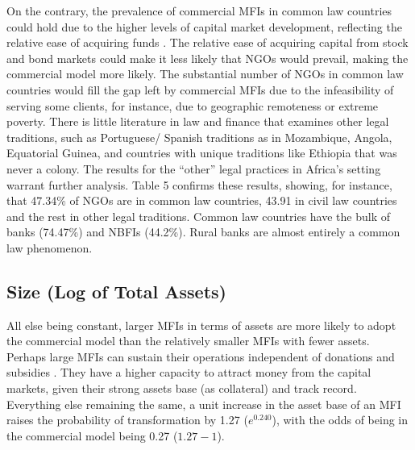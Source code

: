 \documentclass[a4paper,nobind]{templates/ociamthesis}
\begin{document}
On the contrary, the prevalence of commercial MFIs in common law countries could hold due to the higher levels of capital market development, reflecting the relative ease of acquiring funds \autocite{schnyder2018twenty}. The relative ease of acquiring capital from stock and bond markets could make it less likely that NGOs would prevail, making the commercial model more likely. The substantial number of NGOs in common law countries would fill the gap left by commercial MFIs due to the infeasibility of serving some clients, for instance, due to geographic remoteness or extreme poverty. There is little literature in law and finance that examines other legal traditions, such as Portuguese/ Spanish traditions as in Mozambique, Angola, Equatorial Guinea, and countries with unique traditions like Ethiopia that was never a colony. The results for the ``other'' legal practices in Africa's setting warrant further analysis. Table 5 confirms these results, showing, for instance, that 47.34\% of NGOs are in common law countries, 43.91 in civil law countries and the rest in other legal traditions. Common law countries have the bulk of banks (74.47\%) and NBFIs (44.2\%). Rural banks are almost entirely a common law phenomenon.

\hypertarget{size-log-of-total-assets}{%
\subsection{Size (Log of Total Assets)}\label{size-log-of-total-assets}}

All else being constant, larger MFIs in terms of assets are more likely to adopt the commercial model than the relatively smaller MFIs with fewer assets. Perhaps large MFIs can sustain their operations independent of donations and subsidies \autocite{d2013unsubsidized}. They have a higher capacity to attract money from the capital markets, given their strong assets base (as collateral) and track record. Everything else remaining the same, a unit increase in the asset base of an MFI raises the probability of transformation by 1.27 (\(e^{0.240}\)), with the odds of being in the commercial model being 0.27 (\(1.27 - 1\)).
\end{document}
